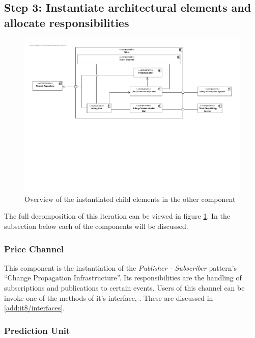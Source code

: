 \subsection{Step 3: Instantiate architectural elements and allocate responsibilities}
\label{add:it10/elements}

\begin{figure}[H]
	\begin{centering}
		\includegraphics[width=\textwidth]{figs/add-it10-elements.pdf}
		\caption{Overview of the instantiated child elements in the other component}
		\label{fig:add/it10/decomposition}
	\end{centering}
\end{figure}

\npar The full decomposition of this iteration can be viewed in figure
\ref{fig:add/it10/decomposition}. In the subsection below each of the components
will be discussed. 

\subsubsection{Price Channel}

\npar This component is the instantiation of the \emph{Publisher - Subscriber}
pattern's ``Change Propagation Infrastructure''. Its responsibilities are the
handling of subscriptions and publications to certain events. Users of this
channel can be invoke one of the methods of it's interface,
. These are discussed in \ref{add:it8/interfaces}.

\subsubsection{Prediction Unit}

